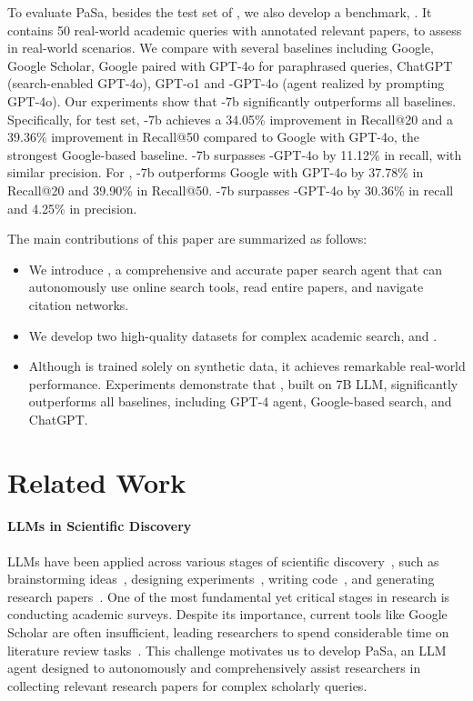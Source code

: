 To evaluate PaSa, besides the test set of \autoS, we also develop a benchmark, \realS. It contains 50 real-world academic queries with annotated relevant papers, to assess \pasa in real-world scenarios. We compare \pasa with several baselines including Google, Google Scholar, Google paired with GPT-4o for paraphrased queries, ChatGPT (search-enabled GPT-4o), GPT-o1 and \pasa-GPT-4o (\pasa agent realized by prompting GPT-4o). Our experiments show that \pasa-7b significantly outperforms all baselines. Specifically, for \autoS test set, \pasa-7b achieves a 34.05\% improvement in Recall@20 and a 39.36\% improvement in Recall@50 compared to Google with GPT-4o, the strongest Google-based baseline. \pasa-7b surpasses \pasa-GPT-4o by 11.12\% in recall, with similar precision. For \realS, \pasa-7b outperforms Google with GPT-4o by 37.78\% in Recall@20 and 39.90\% in Recall@50. \pasa-7b surpasses \pasa-GPT-4o by 30.36\% in recall and 4.25\% in precision.

The main contributions of this paper are summarized as follows:
\begin{itemize}
    \item We introduce \pasa, a comprehensive and accurate paper search agent that can autonomously use online search tools, read entire papers, and navigate citation networks.
    \item We develop two high-quality datasets for complex academic search, \autoS and \realS.
    \item Although \pasa is trained solely on synthetic data, it achieves remarkable real-world performance. Experiments demonstrate that \pasa, built on 7B LLM, significantly outperforms all baselines, including GPT-4 agent, Google-based search, and ChatGPT.

\end{itemize}

\section{Related Work}

\paragraph{LLMs in Scientific Discovery}

LLMs have been applied across various stages of scientific discovery~\cite{van2023ai,lu2024ai,messeri2024artificial,liao2024llms}, such as brainstorming ideas~\cite{girotra2023ideas,wang-etal-2024-scimon,baek2024researchagent}, designing experiments~\cite{m2024augmenting}, writing code~\cite{xu2022systematic}, and generating research papers~\cite{shao-etal-2024-assisting,agarwal2024litllm,wang2024autosurvey}. One of the most fundamental yet critical stages in research is conducting academic surveys. Despite its importance, current tools like Google Scholar are often insufficient, leading researchers to spend considerable time on literature review tasks~\cite{kingsley2011not,gusenbauer2021every,gusenbauer2020academic}. This challenge motivates us to develop PaSa, an LLM agent designed to autonomously and comprehensively assist researchers in collecting relevant research papers for complex scholarly queries.

